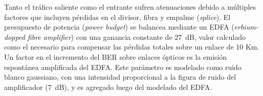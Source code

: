 
Tanto el tráfico saliente como el entrante sufren atenuaciones debido a múltiples factores que incluyen pérdidas en el divisor, fibra y empalme (\textit{splice}). El presupuesto de potencia (\textit{power budget}) se balancea mediante un EDFA (\textit{erbium-dopped fibre amplifier}) con una ganancia constante de $27$~dB, valor calculado como el necesario para compensar las pérdidas totales sobre un enlace de 10 Km. Un factor en el incremento del BER sobre enlaces ópticos es  la emisión espontánea amplificada del EDFA. Este parámetro es modelado como ruido blanco gaussiano, con una intensidad proporcional a la figura de ruido del amplificador ($7$~dB), y es agregado luego del modelado del EDFA.



